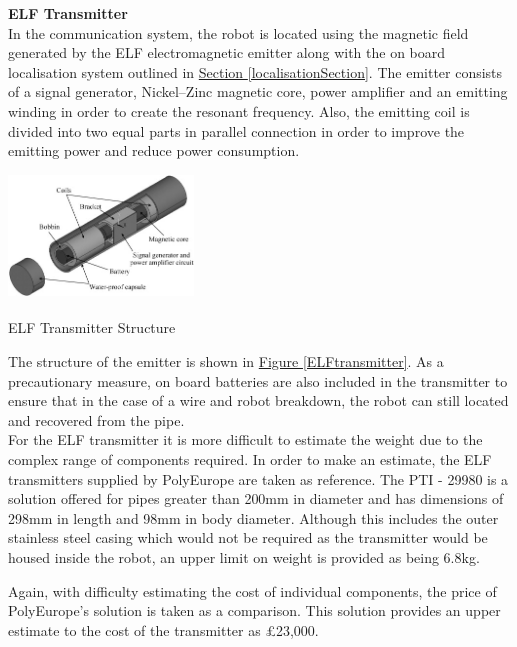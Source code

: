 \documentclass[11pt]{article}		%
\newcommand{\supercite}[1]{\textsuperscript{\cite{#1}}}		%
\newcommand{\figref}[1]{\hyperref[#1]{Figure \ref*{#1}}}    %
\newcommand{\sectref}[1]{\hyperref[#1]{Section \ref*{#1}}}     %
\begin{document}
	        \textbf{ELF Transmitter}
            \\
	        In the communication system, the robot is located using the magnetic field generated by the ELF electromagnetic emitter along with the on board localisation system outlined in \sectref{localisationSection}. 
	        The emitter consists of a signal generator, Nickel–Zinc magnetic core, power amplifier and an emitting winding in order to create the resonant frequency. 
	        Also, the emitting coil is divided into two equal parts in parallel connection in order to improve the emitting power and reduce power consumption. 
	        \begin{floatingfigure}[r]{0.4\textwidth}
				\centering
				\includegraphics[width = 0.37\textwidth]{ELFtransmitter.jpg}
				\caption{ELF Transmitter Structure \supercite{ELFTransmitter}}
				\label{ELFtransmitter}
	        \end{floatingfigure}
            \hspace*{3ex}The structure of the emitter is shown in \figref{ELFtransmitter}. 
	        As a precautionary measure, on board batteries are also included in the transmitter to ensure that in the case of a wire and robot breakdown, the robot can still located and recovered from the pipe. 
            \\
            \hspace*{3ex}For the ELF transmitter it is more difficult to estimate the weight due to the complex range of components required. In order to make an estimate, the ELF transmitters supplied by PolyEurope are taken as reference. The PTI - 29980 is a solution offered for pipes greater than 200mm in diameter and has dimensions of 298mm in length and 98mm in body diameter. Although this includes the outer stainless steel casing which would not be required as the transmitter would be housed inside the robot, an upper limit on weight is provided as being 6.8kg.\\
			\begin{floatingfigure}[r]{0pt} \end{floatingfigure}
		    \hspace*{3ex}Again, with difficulty estimating the cost of individual components, the price of PolyEurope’s solution is taken as a comparison. This solution provides an upper estimate to the cost of the transmitter as £23,000. 
			
\end{document}
